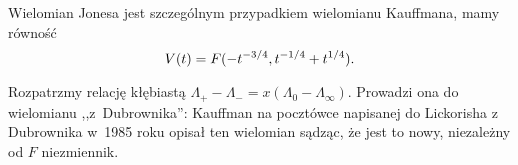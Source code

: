 \begin{proposition}
%
    Wielomian Jonesa jest szczególnym przypadkiem wielomianu Kauffmana, mamy równość
    \begin{equation}
        V(t)=F(-t^{-3/4},t^{-1/4}+t^{1/4}).
    \end{equation}
\end{proposition}

Rozpatrzmy relację kłębiastą $\Lambda_+ - \Lambda_- = x(\Lambda_0 - \Lambda_\infty)$.
Prowadzi ona do wielomianu ,,z~Dubrownika'': Kauffman na pocztówce napisanej do Lickorisha z Dubrownika w~1985 roku opisał ten wielomian sądząc, że jest to nowy, niezależny od $F$ niezmiennik.
%
%
%


